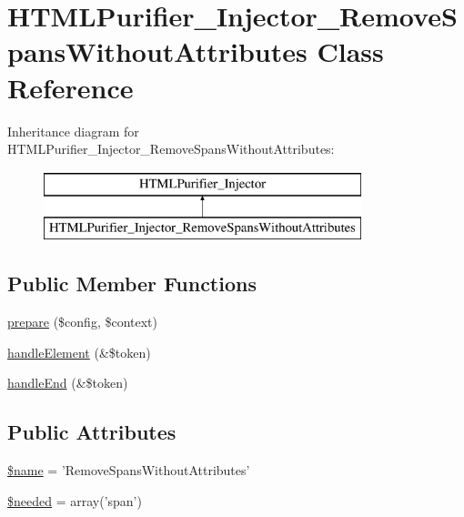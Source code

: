 \hypertarget{classHTMLPurifier__Injector__RemoveSpansWithoutAttributes}{\section{H\+T\+M\+L\+Purifier\+\_\+\+Injector\+\_\+\+Remove\+Spans\+Without\+Attributes Class Reference}
\label{classHTMLPurifier__Injector__RemoveSpansWithoutAttributes}
}
Inheritance diagram for H\+T\+M\+L\+Purifier\+\_\+\+Injector\+\_\+\+Remove\+Spans\+Without\+Attributes\+:\begin{figure}[H]
\begin{center}
\leavevmode
\includegraphics[height=2.000000cm]{classHTMLPurifier__Injector__RemoveSpansWithoutAttributes}
\end{center}
\end{figure}
\subsection*{Public Member Functions}
\begin{DoxyCompactItemize}
\item 
\hyperlink{classHTMLPurifier__Injector__RemoveSpansWithoutAttributes_ae81059a36928bee5944fb988d905f77b}{prepare} (\$config, \$context)
\item 
\hyperlink{classHTMLPurifier__Injector__RemoveSpansWithoutAttributes_af51a382f534c815431e571c226ed78b0}{handle\+Element} (\&\$token)
\item 
\hyperlink{classHTMLPurifier__Injector__RemoveSpansWithoutAttributes_aeb1dfb5596dc2309247b9261c82597f3}{handle\+End} (\&\$token)
\end{DoxyCompactItemize}
\subsection*{Public Attributes}
\begin{DoxyCompactItemize}
\item 
\hyperlink{classHTMLPurifier__Injector__RemoveSpansWithoutAttributes_a806ef502c1a96089b35bb3487762c71a}{\$name} = 'Remove\+Spans\+Without\+Attributes'
\item 
\hyperlink{classHTMLPurifier__Injector__RemoveSpansWithoutAttributes_a139f7d7dc8163b21f02cd1838a1ef462}{\$needed} = array('span')
\end{DoxyCompactItemize}
